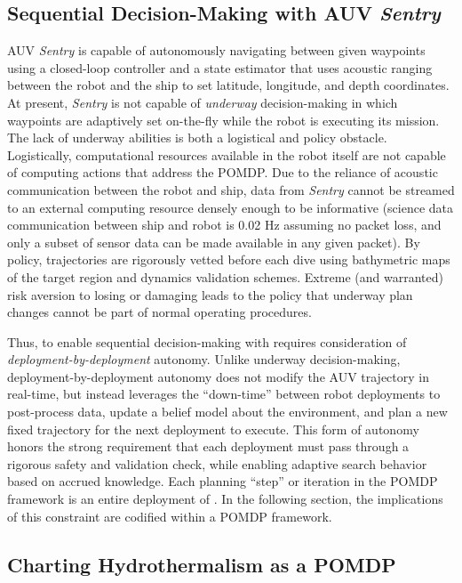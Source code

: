 \subsection{Sequential Decision-Making with AUV \emph{Sentry}}
AUV \emph{Sentry} is capable of autonomously navigating between given waypoints using a closed-loop controller and a state estimator that uses acoustic ranging between the robot and the ship to set latitude, longitude, and depth coordinates. At present, \emph{Sentry} is not capable of \emph{underway} decision-making in which waypoints are adaptively set on-the-fly while the robot is executing its mission. The lack of underway abilities is both a logistical and policy obstacle. Logistically, computational resources available in the robot itself are not capable of computing actions that address the POMDP. Due to the reliance of acoustic communication between the robot and ship, data from \emph{Sentry} cannot be streamed to an external computing resource densely enough to be informative (science data communication between ship and robot is 0.02 Hz assuming no packet loss, and only a subset of sensor data can be made available in any given packet). By policy, \Sentry trajectories are rigorously vetted before each dive using bathymetric maps of the target region and dynamics validation schemes. Extreme (and warranted) risk aversion to losing or damaging \Sentry leads to the policy that underway plan changes cannot be part of normal operating procedures.

Thus, to enable sequential decision-making with \Sentry requires consideration of \emph{deployment-by-deployment} autonomy. Unlike underway decision-making, deployment-by-deployment autonomy does not modify the AUV trajectory in real-time, but instead leverages the ``down-time'' between robot deployments to post-process data, update a belief model about the environment, and plan a new fixed trajectory for the next deployment to execute. This form of autonomy honors the strong requirement that each deployment must pass through a rigorous safety and validation check, while enabling adaptive search behavior based on accrued knowledge. Each planning ``step'' or iteration in the POMDP framework is an entire deployment of \Sentry. In the following section, the implications of this constraint are codified within a POMDP framework.

\subsection{Charting Hydrothermalism as a POMDP}
\label{sec:pomdp}

